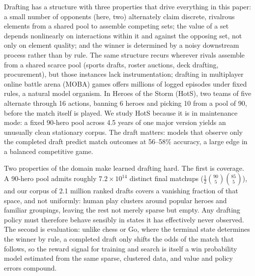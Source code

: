 \documentclass[journal]{IEEEtran}
\begin{document}
Drafting has a structure with three properties that drive everything in this paper: a small number of opponents (here, two) alternately claim discrete, rivalrous elements from a shared pool to assemble competing sets; the value of a set depends nonlinearly on interactions within it and against the opposing set, not only on element quality; and the winner is determined by a noisy downstream process rather than by rule. The same structure recurs wherever rivals assemble from a shared scarce pool (sports drafts, roster auctions, deck drafting, procurement), but those instances lack instrumentation; drafting in multiplayer online battle arena (MOBA) games offers millions of logged episodes under fixed rules, a natural model organism. In Heroes of the Storm (HotS), two teams of five alternate through 16 actions, banning 6 heroes and picking 10 from a pool of 90, before the match itself is played. We study HotS because it is in maintenance mode: a fixed 90-hero pool across 4.5 years of one major version yields an unusually clean stationary corpus. The draft matters: models that observe only the completed draft predict match outcomes at 56--58\% accuracy, a large edge in a balanced competitive game.

Two properties of the domain make learned drafting hard. The first is coverage. A 90-hero pool admits roughly $7.2 \times 10^{14}$ distinct final matchups ($\tfrac{1}{2}\binom{90}{5}\binom{85}{5}$), and our corpus of 2.1 million ranked drafts covers a vanishing fraction of that space, and not uniformly: human play clusters around popular heroes and familiar groupings, leaving the rest not merely sparse but empty. Any drafting policy must therefore behave sensibly in states it has effectively never observed. The second is evaluation: unlike chess or Go, where the terminal state determines the winner by rule, a completed draft only shifts the odds of the match that follows, so the reward signal for training and search is itself a win probability model estimated from the same sparse, clustered data, and value and policy errors compound.
\end{document}
